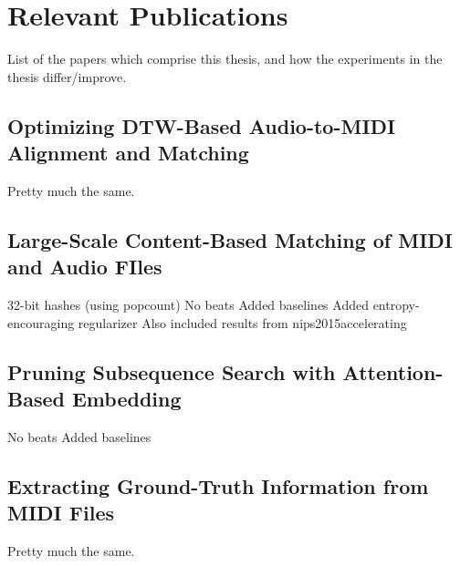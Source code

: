 \chapter{Relevant Publications}



List of the papers which comprise this thesis, and how the experiments in the thesis differ/improve.

\section{Optimizing DTW-Based Audio-to-MIDI Alignment and Matching}

Pretty much the same.

\section{Large-Scale Content-Based Matching of MIDI and Audio FIles}

32-bit hashes (using popcount)
No beats
Added baselines
Added entropy-encouraging regularizer
Also included results from nips2015accelerating

\section{Pruning Subsequence Search with Attention-Based Embedding}

No beats
Added baselines

\section{Extracting Ground-Truth Information from MIDI Files}

Pretty much the same.
